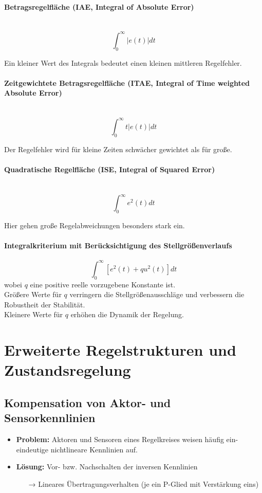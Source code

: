 \documentclass[10pt,a4paper]{article}
\begin{document}
\paragraph{Betragsregelfläche (IAE, Integral of Absolute Error)} ~\\
$$
	\int_0^∞ |e(t)| dt
$$

Ein kleiner Wert des Integrals bedeutet einen kleinen mittleren Regelfehler.

\paragraph{Zeitgewichtete Betragsregelfläche (ITAE, Integral of Time weighted Absolute Error)} ~\\
$$
	\int_0^∞ t|e(t)| dt
$$

Der Regelfehler wird für kleine Zeiten schwächer gewichtet als für große.

\paragraph{Quadratische Regelfläche (ISE, Integral of Squared Error)} ~\\
$$
	\int_0^∞ e^2(t) dt
$$

Hier gehen große Regelabweichungen besonders stark ein.

\paragraph{Integralkriterium mit Berücksichtigung des Stellgrößenverlaufs}
$$
	\int_0^∞ [e^2(t) + qu^2(t)] dt
$$
wobei $q$ eine positive reelle vorzugebene Konstante ist. \\
Größere Werte für $q$ verringern die Stellgrößenausschläge und verbessern die Robustheit der Stabilität. \\
Kleinere Werte für $q$ erhöhen die Dynamik der Regelung.

\section{Erweiterte Regelstrukturen und Zustandsregelung}
\subsection{Kompensation von Aktor- und Sensorkennlinien}
\begin{itemize}
	\item \textbf{Problem:} Aktoren und Sensoren eines Regelkreises weisen häufig ein-eindeutige nichtlineare Kennlinien auf.
	\item \textbf{Lösung:} Vor- bzw. Nachschalten der inversen Kennlinien
	\begin{itemize}
		\item[→] Lineares Übertragungsverhalten (je ein P-Glied mit Verstärkung eins)
	\end{itemize}
\end{itemize}
\end{document}
